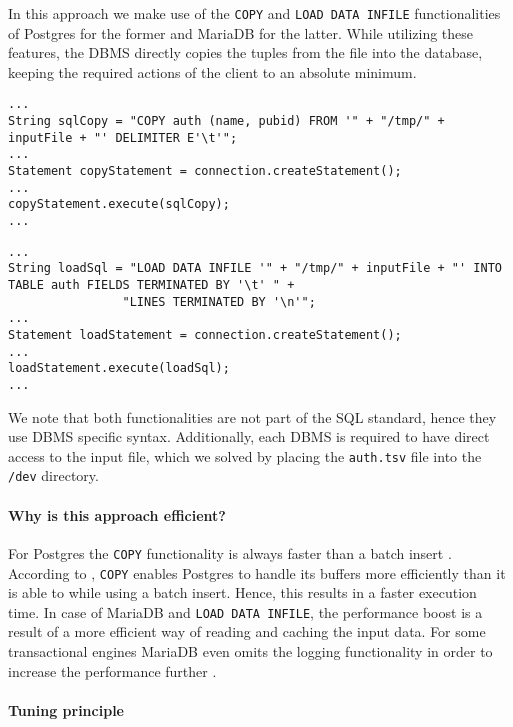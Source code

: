 \documentclass[11pt]{scrartcl}
\begin{document}
In this approach we make use of the \texttt{COPY} and \texttt{LOAD DATA INFILE} functionalities of Postgres for the former
and MariaDB for the latter.
While utilizing these features, the DBMS directly copies the tuples from the file into the database, keeping the
required actions of the client to an absolute minimum.

\begin{lstlisting}[style=mystyle-java, caption={Implementation: \texttt{COPY} functionality of Postgres}]
...
String sqlCopy = "COPY auth (name, pubid) FROM '" + "/tmp/" + inputFile + "' DELIMITER E'\t'";
...
Statement copyStatement = connection.createStatement();
...
copyStatement.execute(sqlCopy);
...
\end{lstlisting}

\begin{lstlisting}[style=mystyle-java, caption={Implementation: \texttt{LOAD DATA INFILE} functionality of MariaDB}]
...
String loadSql = "LOAD DATA INFILE '" + "/tmp/" + inputFile + "' INTO TABLE auth FIELDS TERMINATED BY '\t' " +
                "LINES TERMINATED BY '\n'";
...
Statement loadStatement = connection.createStatement();
...
loadStatement.execute(loadSql);
...
\end{lstlisting}

We note that both functionalities are not part of the SQL standard, hence they use DBMS specific syntax.
Additionally, each DBMS is required to have direct access to the input file, which we solved by placing the \texttt{auth.tsv}
file into the \texttt{/dev} directory.

\paragraph{Why is this approach efficient?}

For Postgres the \texttt{COPY} functionality is always faster than a batch insert \cite{Zamora2020}.
According to \cite{pganalyze2020}, \texttt{COPY} enables Postgres to handle its buffers more efficiently than it is able
to while using a batch insert.
Hence, this results in a faster execution time.
In case of MariaDB and \texttt{LOAD DATA INFILE}, the performance boost is a result of a more efficient way of
reading and caching the input data.
For some transactional engines MariaDB even omits the logging functionality in order to increase the performance further
\cite{MariaDBInsertData2021}.

\paragraph{Tuning principle}
\end{document}
